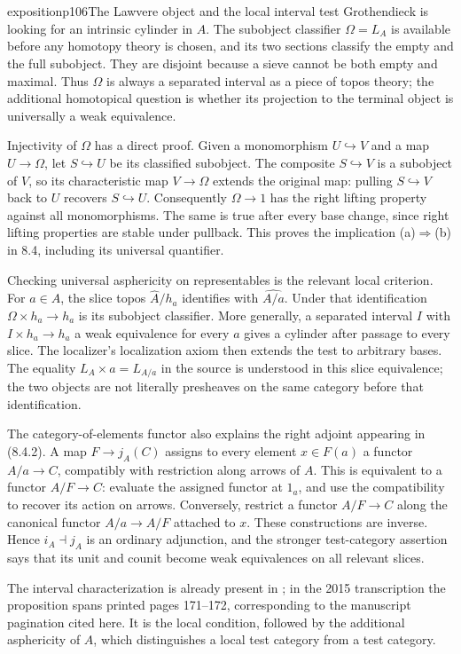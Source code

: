 \begin{dcomment}{exposition}{p106}{The Lawvere object and the local interval test}
Grothendieck is looking for an intrinsic cylinder in $\widehat A$. The subobject classifier $\Omega=L_A$ is available before any homotopy theory is chosen, and its two sections classify the empty and the full subobject. They are disjoint because a sieve cannot be both empty and maximal. Thus $\Omega$ is always a separated interval as a piece of topos theory; the additional homotopical question is whether its projection to the terminal object is universally a weak equivalence.

Injectivity of $\Omega$ has a direct proof. Given a monomorphism $U\hookrightarrow V$ and a map $U\to\Omega$, let $S\hookrightarrow U$ be its classified subobject. The composite $S\hookrightarrow V$ is a subobject of $V$, so its characteristic map $V\to\Omega$ extends the original map: pulling $S\hookrightarrow V$ back to $U$ recovers $S\hookrightarrow U$. Consequently $\Omega\to1$ has the right lifting property against all monomorphisms. The same is true after every base change, since right lifting properties are stable under pullback. This proves the implication (a)$\Rightarrow$(b) in 8.4, including its universal quantifier.

Checking universal asphericity on representables is the relevant local criterion. For $a\in A$, the slice topos $\widehat A/h_a$ identifies with $\widehat{A/a}$. Under that identification $\Omega\times h_a\to h_a$ is its subobject classifier. More generally, a separated interval $I$ with $I\times h_a\to h_a$ a weak equivalence for every $a$ gives a cylinder after passage to every slice. The localizer's localization axiom then extends the test to arbitrary bases. The equality $L_A\times a=L_{A/a}$ in the source is understood in this slice equivalence; the two objects are not literally presheaves on the same category before that identification.

The category-of-elements functor also explains the right adjoint appearing in (8.4.2). A map $F\to j_A(C)$ assigns to every element $x\in F(a)$ a functor $A/a\to C$, compatibly with restriction along arrows of $A$. This is equivalent to a functor $A/F\to C$: evaluate the assigned functor at $1_a$, and use the compatibility to recover its action on arrows. Conversely, restrict a functor $A/F\to C$ along the canonical functor $A/a\to A/F$ attached to $x$. These constructions are inverse. Hence $i_A\dashv j_A$ is an ordinary adjunction, and the stronger test-category assertion says that its unit and counit become weak equivalences on all relevant slices.

The interval characterization is already present in \citet[\S65, Proposition 3 and Corollary 1]{Grothendieck1983}; in the 2015 transcription the proposition spans printed pages 171--172, corresponding to the manuscript pagination cited here. It is the local condition, followed by the additional asphericity of $A$, which distinguishes a local test category from a test category.
\end{dcomment}

